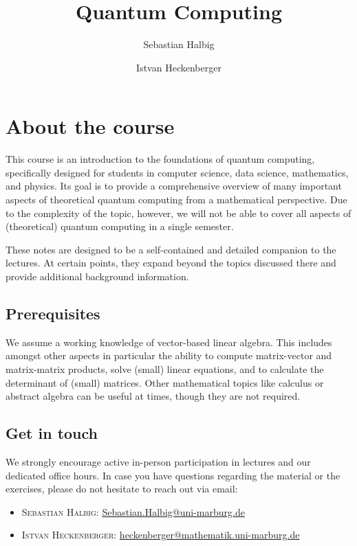 \documentclass[a4paper, oneside, 12pt]{amsart}
\title{Quantum Computing}
\author{Sebastian Halbig}
\author{Istvan Heckenberger}
\begin{document}
\maketitle
\tableofcontents

\cleardoublepage

\section*{About the course}
This course is an introduction to the foundations of quantum computing, specifically designed for students in computer science, data science, mathematics, and physics.
Its goal is to provide a comprehensive overview of many important aspects of theoretical quantum computing from a mathematical perspective.
Due to the complexity of the topic, however, we will not be able to cover all aspects of (theoretical) quantum computing in a single semester.

These notes are designed to be a  self-contained and detailed companion to the lectures.
At certain points, they expand beyond the topics discussed there and provide additional background information.

\subsection*{Prerequisites}
We assume a working knowledge of vector-based linear algebra.
This includes amongst other aspects in particular the ability to compute matrix-vector and matrix-matrix products, solve (small) linear equations, and to calculate the determinant of (small) matrices.
Other mathematical topics like calculus or abstract algebra can be useful at times, though they are not required.

\subsection*{Get in touch}
We strongly encourage active in-person participation in lectures and our dedicated office hours.
In case you have questions regarding the material or the exercises, please do not hesitate to reach out via email:
\begin{itemize}
  \item \textsc{Sebastian Halbig:} \url{Sebastian.Halbig@uni-marburg.de}
  \item \textsc{Istvan Heckenberger:} \url{heckenberger@mathematik.uni-marburg.de}
\end{itemize}
\end{document}

